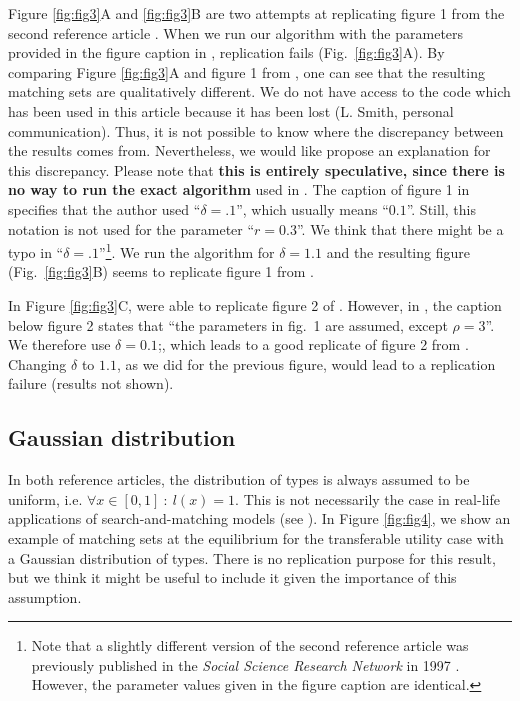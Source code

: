 Figure \ref{fig:fig3}A and \ref{fig:fig3}B are two attempts at replicating figure 1 from the second reference article \citep{smith_marriage_2006}. When we run our algorithm with the parameters provided in the figure caption in \citep{smith_marriage_2006}, replication fails (Fig.~\ref{fig:fig3}A). By comparing Figure \ref{fig:fig3}A and figure 1 from \citep{smith_marriage_2006}, one can see that the resulting matching sets are qualitatively different. We do not have access to the code which has been used in this article because it has been lost (L. Smith, personal communication). Thus, it is not possible to know where the discrepancy between the results comes from. Nevertheless, we would like propose an explanation for this discrepancy. Please note that \textbf{this is entirely speculative, since there is no way to run the exact algorithm} used in \citep{smith_marriage_2006}. The caption of figure 1 in \citep{smith_marriage_2006} specifies that the author used ``$\delta=.1$'', which usually means ``$0.1$''. Still, this notation is not used for the parameter ``$r=0.3$''. We think that there might be a typo in ``$\delta=.1$''\footnote{Note that a slightly different version of the second reference article \citep{smith_marriage_2006} was previously published in the \textit{Social Science Research Network} in 1997 \citep{smith_marriage_1997}. However, the parameter values given in the figure caption are identical.}. We run the algorithm for $\delta=1.1$ and the resulting figure (Fig.~\ref{fig:fig3}B) seems to replicate figure 1 from \citep{smith_marriage_2006}.

In Figure \ref{fig:fig3}C, were able to replicate figure 2 of \citep{smith_marriage_2006}. However, in \citep{smith_marriage_2006}, the caption below figure 2 states that ``the parameters in fig.~1 are assumed, except $\rho=3$''. We therefore use $\delta=0.1$;, which leads to a good replicate of figure 2 from \citep{smith_marriage_2006}. Changing $\delta$ to $1.1$, as we did for the previous figure, would lead to a replication failure (results not shown).


\subsection*{Gaussian distribution}

In both reference articles, the distribution of types is always assumed to be uniform, i.e. $\forall x \in [0,1] \ : \ l(x)=1$. This is not necessarily the case in real-life applications of search-and-matching models (see \citep{hagedorn_identifying_2017}). In Figure \ref{fig:fig4}, we show an example of matching sets at the equilibrium for the transferable utility case with a Gaussian distribution of types. There is no replication purpose for this result, but we think it might be useful to include it given the importance of this assumption.

